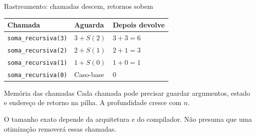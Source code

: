 \begin{frame}{Rastreamento: chamadas descem, retornos sobem}
\small
\begin{tabular}{lll}
\toprule
Chamada & Aguarda & Depois devolve \\
\midrule
\texttt{soma\_recursiva(3)} & $3 + S(2)$ & $3 + 3 = 6$ \\
\texttt{soma\_recursiva(2)} & $2 + S(1)$ & $2 + 1 = 3$ \\
\texttt{soma\_recursiva(1)} & $1 + S(0)$ & $1 + 0 = 1$ \\
\texttt{soma\_recursiva(0)} & Caso-base & $0$ \\
\bottomrule
\end{tabular}
\begin{block}{Memória das chamadas}
Cada chamada pode precisar guardar argumentos, estado e endereço de retorno na pilha. A profundidade cresce com $n$.
\end{block}
\small O tamanho exato depende da arquitetura e do compilador. Não presuma que uma otimização removerá essas chamadas.
\end{frame}
